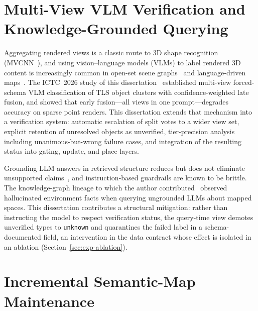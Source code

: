 \section{Multi-View VLM Verification and Knowledge-Grounded Querying}
\label{sec:rw-vlm}

Aggregating rendered views is a classic route to 3D shape recognition
(MVCNN~\cite{su2015mvcnn}), and using vision--language models (VLMs) to label
rendered 3D content is increasingly common in open-set scene
graphs~\cite{gu2024conceptgraphs} and language-driven
maps~\cite{huang2023vlmaps}. The ICTC~2026 study of this
dissertation~\cite{kim2026ictc} established multi-view forced-schema VLM
classification of TLS object clusters with confidence-weighted late fusion,
and showed that early fusion---all views in one prompt---degrades accuracy on
sparse point renders. This dissertation extends that mechanism into a
verification system: automatic escalation of split votes to a wider view set,
explicit retention of unresolved objects as unverified, tier-precision
analysis including unanimous-but-wrong failure cases, and integration of the
resulting status into gating, update, and place layers.

Grounding LLM answers in retrieved structure reduces but does not eliminate
unsupported claims~\cite{lewis2020rag,ji2023hallucination}, and
instruction-based guardrails are known to be brittle. The knowledge-graph
lineage to which the author contributed~\cite{kim2025isis} observed
hallucinated environment facts when querying ungrounded LLMs about mapped
spaces. This dissertation contributes a structural mitigation: rather than
instructing the model to respect verification status, the query-time view
demotes unverified types to \texttt{unknown} and quarantines the failed label in
a schema-documented field, an intervention in the data contract whose effect is
isolated in an ablation (Section~\ref{sec:exp-ablation}).

\section{Incremental Semantic-Map Maintenance}
\label{sec:rw-update}

